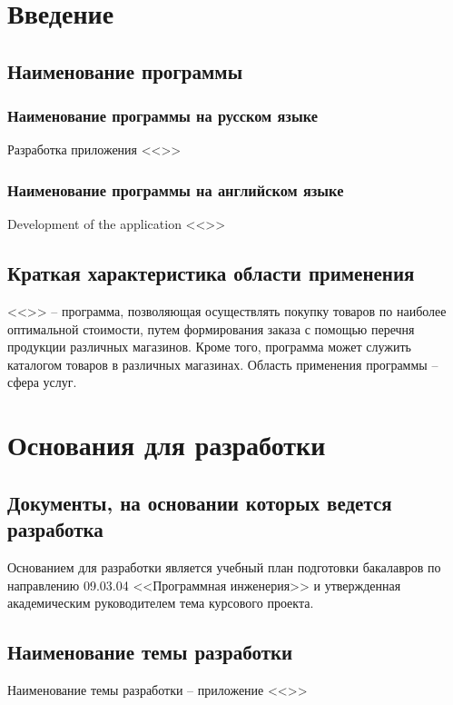 \documentclass[a4paper,12pt,reqno]{article}
\begin{document}
  \CRTpreamble

  \section{Введение}
  \subsection{Наименование программы}
  \subsubsection{Наименование программы на русском языке}
  Разработка приложения <<\CRTname>>
  \subsubsection{Наименование программы на английском языке}
  Development of the application <<\CRTnameeng>>


  \subsection{Краткая характеристика области применения}
  <<\CRTname>> -- программа, позволяющая осуществлять покупку товаров по наиболее оптимальной стоимости,
  путем формирования заказа с помощью перечня продукции различных магазинов.
  Кроме того, программа может служить каталогом товаров в различных магазинах.
  Область применения программы -- сфера услуг.

  \newpage
  \section{Основания для разработки}
  \subsection{Документы, на основании которых ведется разработка}
  Основанием для разработки является учебный план подготовки бакалавров по направлению 09.03.04 <<Программная инженерия>> и утвержденная академическим руководителем тема курсового проекта.

  \subsection{Наименование темы разработки}
  Наименование темы разработки -- приложение <<\CRTname>>
\end{document}
